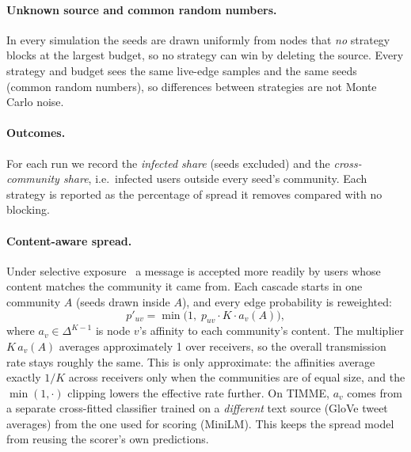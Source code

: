 \paragraph{Unknown source and common random numbers.}
In every simulation the seeds are drawn uniformly from nodes that \emph{no} strategy
blocks at the largest budget, so no strategy can win by deleting the source. Every
strategy and budget sees the same live-edge samples and the same seeds (common random
numbers), so differences between strategies are not Monte Carlo noise.

\paragraph{Outcomes.}
For each run we record the \emph{infected share} (seeds excluded) and the
\emph{cross-community share}, i.e.\ infected users outside every seed's community.
Each strategy is reported as the percentage of spread it removes compared with no
blocking.

\paragraph{Content-aware spread.}
Under selective exposure~\citep{delvicario2016spreading} a message is accepted more
readily by users whose content matches the community it came from. Each cascade
starts in one community $A$ (seeds drawn inside $A$), and every edge probability is
reweighted:
\begin{equation}
  p'_{uv} = \min\bigl(1,\; p_{uv}\cdot K\cdot a_v(A)\bigr),
\end{equation}
where $a_v \in \Delta^{K-1}$ is node $v$'s affinity to each community's content. The
multiplier $K\,a_v(A)$ averages approximately 1 over receivers, so the overall
transmission rate stays roughly the same. This is only approximate: the affinities
average exactly $1/K$ across receivers only when the communities are of equal size,
and the $\min(1,\cdot)$ clipping lowers the effective rate further. On
TIMME, $a_v$ comes from a separate cross-fitted classifier trained on a \emph{different}
text source (GloVe tweet averages) from the one used for scoring (MiniLM). This keeps
the spread model from reusing the scorer's own predictions.

